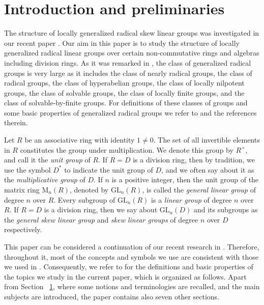 \documentclass{amsart}
\theoremstyle{definition}
\begin{document}
\tableofcontents
	
\section{Introduction and preliminaries}\label{Intro}

	The structure of locally generalized radical skew linear groups was investigated in our recent paper \cite{Pa_ChuaHai_2026}. Our aim in this paper is to study the structure of locally generalized radical linear groups over certain non-commutative rings and algebras including division rings. As it was remarked in  \cite{Pa_ChuaHai_2026}, the class of generalized radical groups is very large as it includes the class of nearly radical groups, the class of radical groups,
	the class of hyperabelian groups, the class of locally nilpotent groups, the class of solvable
	groups, the class of locally finite groups, and the class of solvable-by-finite groups. For definitions of these classes of groups and some basic properties of generalized radical groups we refer to \cite{Pa_ChuaHai_2026} and the references therein. 
	
Let $R$ be an associative ring with identity $1\ne 0$. The set of all invertible elements in $R$ constitutes the group under multiplication. 
We denote this group by $R^\times$, and call it the \textit{unit group} of $R$. If $R=D$ is a division ring, then by tradition, we use the symbol $D^*$ to indicate the unit group of $D$, and we often say about it as the \textit{multiplicative group} of $D$. If $n$ is a positive integer, then the unit group of the matrix ring $\mathrm{M}_n(R)$, denoted by $\mathrm{GL}_n(R)$, is called the \textit{general linear group} of degree $n$ over $R$. Every subgroup of $\mathrm{GL}_n(R)$ is a \textit{linear group} of degree $n$ over $R$. If $R=D$ is a division ring, then we say about $\mathrm{GL}_n(D)$ and its subgroups as the \textit{general skew linear group} and \textit{skew linear groups} of degree $n$ over $D$ respectively. 
	
This paper can be considered a continuation of our recent research in \cite{Pa_ChuaHai_2026}. Therefore, throughout it, most of the concepts and symbols we use are consistent with those we used in \cite{Pa_ChuaHai_2026}. Consequently, we refer to \cite{Pa_ChuaHai_2026} for the definitions and basic properties of the topics we study in the current paper, which is organized as follows. Apart from Section~ \ref{Intro}, where some notions and terminologies are recalled, and the main subjects are introduced, the paper contains also seven other sections. 
	
\end{document}
